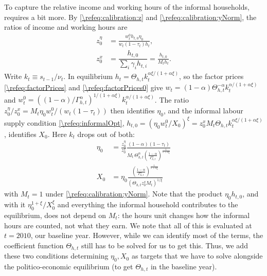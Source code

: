 To capture the relative income and working hours of the informal households, requires a bit more. By \eqref{\refeq:calibration:z} and \eqref{\refeq:calibration:yNorm}, the ratios of income and working hours are
\begin{align*}
    z_0^{\eta} &= \frac{w_t^0h_{t,0}\eta_{0}}{w_t(1-\tau_t)h_t}, \\
    z_0^x &= \dfrac{h_{t,0}}{\sum_i \gamma_{i} h_{t,i}} = \frac{h_{t,0}}{M_th_t}.
\end{align*}
Write $k_t\equiv s_{t-1}/\nu_t$. In equilibrium $h_t = \Theta_{h,t}k_t^{\alpha\xi/(1+\alpha\xi)}$, so the factor prices \eqref{\refeq:factorPrices} and \eqref{\refeq:factorPrices0} give $w_t = (1-\alpha)\Theta_{h,t}^{-\alpha}k_t^{\alpha/(1+\alpha\xi)}$ and $w_t^0 = \left((1-\alpha)/\Gamma_{h,t}^{\alpha}\right)^{1/(1+\alpha\xi)}k_t^{\alpha/(1+\alpha\xi)}$. The ratio $z_0^{\eta}/z_0^x = M_t\eta_0w_t^0/\left(w_t(1-\tau_t)\right)$ then identifies $\eta_0$, and the informal labour supply condition \eqref{\refeq:informalOpt}, $h_{t,0} = (\eta_0w_t^0/X_0)^{\xi} = z_0^xM_t\Theta_{h,t}k_t^{\alpha\xi/(1+\alpha\xi)}$, identifies $X_0$. Here $k_t$ drops out of both:
\begin{align}
    \eta_{0} &= \frac{z_0^{\eta}}{z_0^x}\frac{(1-\alpha)(1-\tau_t)}{M_t\,\Theta_{h,t}^{\alpha}\left(\frac{1-\alpha}{\Gamma_{h,t}^{\alpha}}\right)^{\frac{1}{1+\alpha\xi}}} \label{\refeq:calibration:eta0}\\
    X_{0} &= \eta_{0}\frac{\left(\frac{1-\alpha}{\Gamma_{h,t}^{\alpha}}\right)^{\frac{1}{1+\alpha\xi}}}{\left(\Theta_{h,t}z_0^xM_t\right)^{1/\xi}} \label{\refeq:calibration:X0}
\end{align}
with $M_t = 1$ under \eqref{\refeq:calibration:yNorm}. Note that the product $\eta_0h_{t,0}$, and with it $\eta_0^{1+\xi}/X_0^{\xi}$ and everything the informal household contributes to the equilibrium, does not depend on $M_t$: the hours unit changes how the informal hours are counted, not what they earn.
We note that all of this is evaluated at $t=2010$, our baseline year. However, while we can identify most of the terms, the coefficient function $\Theta_{h,t}$ still has to be solved for us to get this. Thus, we add these two conditions determining $\eta_0, X_0$ as targets that we have to solve alongside the politico-economic equilibrium (to get $\Theta_{h,t}$ in the baseline year).



